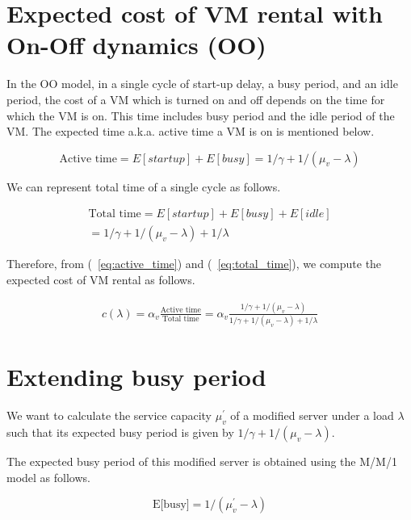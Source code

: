 \documentclass[letter,9pt, twocolumn]{article}
\begin{document}
\section{Expected cost of VM rental with On-Off dynamics (OO)}

In the OO model, in a single cycle of start-up delay, a busy period, and an idle period, the cost of a VM which is turned on and off depends on the time for which the VM is on. This time includes busy period and the idle period of the VM. The expected time a.k.a. active time a VM is on is mentioned below.

\begin{equation}
\text{Active time} = E[startup] + E[busy] = 1/\gamma + 1/(\mu_v - \lambda) 
\label{eq:active_time}
\end{equation}

We can represent total time of a single cycle as follows.

\begin{equation}
\begin{split}
\text{Total time} = E[startup] + E[busy] + E[idle] \\
= 1/\gamma + 1/(\mu_v - \lambda) + 1/\lambda
\end{split}
\label{eq:total_time}
\end{equation}

Therefore, from (~\ref{eq:active_time}) and (~\ref{eq:total_time}), we compute the expected cost of VM rental as follows.

\begin{equation}
\begin{split}
c(\lambda) = \alpha_v \frac{\text{Active time}}{\text{Total time}} = \alpha_v \frac{1/\gamma + 1/(\mu_v - \lambda)}{1/\gamma + 1/(\mu_v - \lambda) + 1/\lambda}
\end{split}
\label{eq:cost_onoff}
\end{equation}

\section{Extending busy period}

We want to calculate the service capacity $\mu_v^{'}$ of a modified server under a load $\lambda$ such that its expected busy period is given by $1/\gamma + 1/(\mu_v - \lambda)$.

The expected busy period of this modified server is obtained using the M/M/1 model as follows.

\begin{equation}
\text{E[busy]}  = 1/(\mu_v^{'} - \lambda)
\label{eq:busy_period}
\end{equation}
\end{document}

